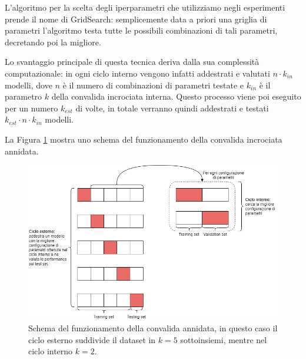 \documentclass[../../main.tex]{subfiles}
\begin{document}
    L'algoritmo per la scelta degli iperparametri che utilizziamo negli esperimenti prende il nome di GridSearch: semplicemente data a priori una griglia di parametri l'algoritmo testa tutte le possibili combinazioni di tali parametri, decretando poi la migliore.

    Lo svantaggio principale di questa tecnica deriva dalla sua complessità computazionale: in ogni ciclo interno vengono infatti addestrati e valutati $n \cdot k_{in}$ modelli, dove $n$ è il numero di combinazioni di parametri testate e $k_{in}$ è il parametro $k$ della convalida incrociata interna. Questo processo viene poi eseguito per un numero $k_{est}$ di volte, in totale verranno quindi addestrati e testati $k_{est} \cdot n \cdot k_{in}$ modelli.

    La Figura \ref{fig:nestedCV} mostra uno schema del funzionamento della convalida incrociata annidata.

    \begin{figure}[H]
        \centering
        \includegraphics[width=\textwidth]{immagini/6_3/nestedCV.drawio.png}
        \caption{Schema del funzionamento della convalida annidata, in questo caso il ciclo esterno suddivide il dataset in $k=5$ sottoinsiemi, mentre nel ciclo interno $k = 2$.}
        \label{fig:nestedCV}
    \end{figure}
\end{document}
